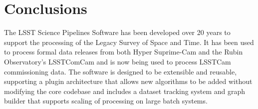 \section{Conclusions}
\label{sec:conclusions}

The LSST Science Pipelines Software has been developed over 20 years to support the processing of the Legacy Survey of Space and Time.
It has been used to process formal data releases from both Hyper Suprime-Cam and the Rubin Observatory's LSSTComCam and is now being used to process LSSTCam commissioning data.
The software is designed to be extensible and reusable, supporting a plugin architecture that allows new algorithms to be added without modifying the core codebase and includes a dataset tracking system and graph builder that supports scaling of processing on large batch systems.
